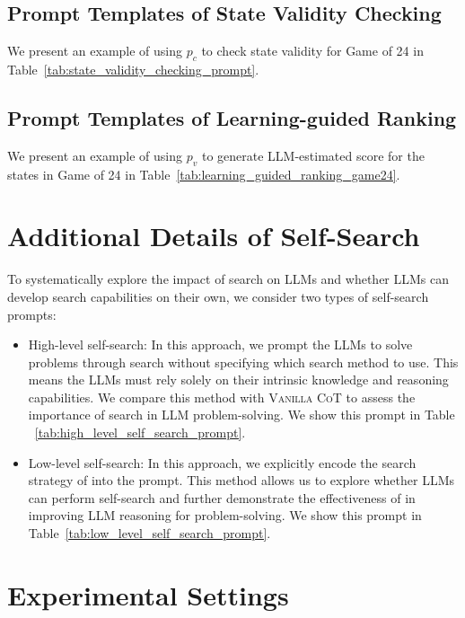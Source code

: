 \subsection{Prompt Templates of State Validity Checking}
\label{appendix:prompt_templates_state_validity_checking}
We present an example of using $p_{c}$ to check state validity for Game of 24 in Table~\ref{tab:state_validity_checking_prompt}.

\subsection{Prompt Templates of Learning-guided Ranking}
\label{appendix:prompt_templates_learning_guided_ranking}
We present an example of using $p_{v}$ to generate LLM-estimated score for the states in Game of 24 in Table~\ref{tab:learning_guided_ranking_game24}.
\section{Additional Details of Self-Search} 
\label{appendix:more_details_self_search}

To systematically explore the impact of search on LLMs and whether LLMs can develop search capabilities on their own, we consider two types of self-search prompts:
\begin{itemize}[leftmargin=*]
    \item High-level self-search: In this approach, we prompt the LLMs to solve problems through search without specifying which search method to use. This means the LLMs must rely solely on their intrinsic knowledge and reasoning capabilities. We compare this method with \textsc{Vanilla CoT} to assess the importance of search in LLM problem-solving. We show this prompt in Table ~\ref{tab:high_level_self_search_prompt}.
    \item Low-level self-search: In this approach, we explicitly encode the search strategy of \method into the prompt. This method allows us to explore whether LLMs can perform self-search and further demonstrate the effectiveness of \method in improving LLM reasoning for problem-solving. We show this prompt in Table~\ref{tab:low_level_self_search_prompt}.

\end{itemize}


\section{Experimental Settings}
\label{appendix:experimental_settings}
